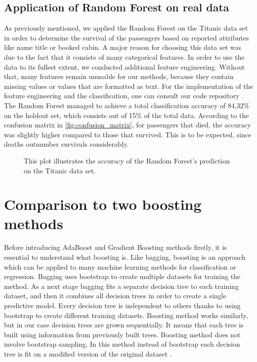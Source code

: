 \subsection{Application of Random Forest on real data}
\label{sec:real_data}
As previously mentioned, we applied the Random Forest on the Titanic data set \cite{titanicData} in order
to determine the survival of the passengers based on reported attributes like name title or booked cabin.
A major reason for choosing this data set was due to the fact that it consists of many categorical features.
In order to use the data to its fullest extent, we conducted additional feature engineering. 
Without that, many features remain unusable for our methods, 
because they contain missing values or values that are formatted as text.
For the implementation of the feature engineering and the classification,
one can consult our code repository \cite{githubApplication}.
The Random Forest managed to achieve a total classification accuracy of 84,32\% on the holdout set,
which consists out of 15\% of the total data.
According to the confusion matrix in \autoref{fig:confusion_matrix}, for passengers that died, 
the accuracy was slightly higher compared to those that survived. This is to be expected,
since deaths outnumber survivals considerably.

\begin{figure}[H]
    \captionsetup{format=plain}
    \caption
        {This plot illustrates the accuracy of the Random Forest's prediction on the Titanic data set.
        }
    \label{fig:confusion_matrix}
\end{figure}


\section{Comparison to two boosting methods}
Before introducing AdaBoost and Gradient Boosting methods firstly, it is essential to understand what boosting is. Like bagging, boosting is an approach which can be applied to many machine learning methods for classification or regression. Bagging uses bootstrap to create multiple datasets for training the method. As a next stage bagging fits a separate decision tree to each training dataset, and then it combines all decision trees in order to create a single predictive model. Every decision tree is independent to others thanks to using bootstrap to create different training datasets. Boosting method works similarly, but in our case decision trees are grown sequentially. It means that each tree is built using information from previously built trees. Boosting method does not involve bootstrap sampling. In this method instead of bootstrap each decision tree is fit on a modified version of the original dataset \cite{James2013}.

